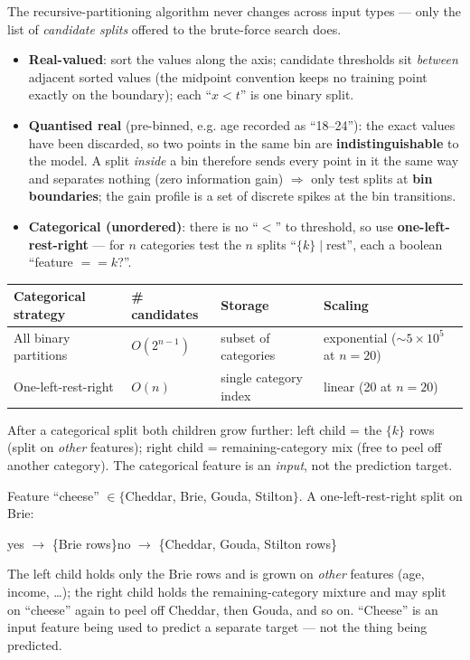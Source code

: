 \documentclass[11pt, a4paper]{article}
\newcommand{\thead}[1]{\textbf{#1}}
\newcommand{\kw}[1]{\textbf{#1}}
\begin{document}
The recursive-partitioning algorithm never changes across input types — only the list of
\emph{candidate splits} offered to the brute-force search does.

\begin{itemize}
  \item \kw{Real-valued}: sort the values along the axis; candidate thresholds sit \emph{between}
  adjacent sorted values (the midpoint convention keeps no training point exactly on the boundary);
  each ``$x<t$'' is one binary split.
  \item \kw{Quantised real} (pre-binned, e.g. age recorded as ``18--24''): the exact values have been
  discarded, so two points in the same bin are \kw{indistinguishable} to the model. A split
  \emph{inside} a bin therefore sends every point in it the same way and separates nothing (zero
  information gain) $\Rightarrow$ only test splits at \kw{bin boundaries}; the gain profile is a set
  of discrete spikes at the bin transitions.
  \item \kw{Categorical (unordered)}: there is no ``$<$'' to threshold, so use
  \kw{one-left-rest-right} — for $n$ categories test the $n$ splits ``$\{k\}\mid\text{rest}$'', each a
  boolean ``feature $==k$?''.
\end{itemize}

\begin{center}
\renewcommand{\arraystretch}{1.2}
\begin{tabularx}{\linewidth}{l l l X}
\toprule
\thead{Categorical strategy} & \thead{\# candidates} & \thead{Storage} & \thead{Scaling} \\
\midrule
All binary partitions & $O(2^{n-1})$ & subset of categories & exponential ($\sim5\times10^5$ at $n{=}20$) \\
One-left-rest-right & $O(n)$ & single category index & linear (20 at $n{=}20$) \\
\bottomrule
\end{tabularx}
\end{center}

After a categorical split both children grow further: left child = the $\{k\}$ rows (split on
\emph{other} features); right child = remaining-category mix (free to peel off another category).
The categorical feature is an \emph{input}, not the prediction target.

\begin{exbox}
Feature ``cheese'' $\in\{$Cheddar, Brie, Gouda, Stilton$\}$. A one-left-rest-right split on Brie:
\begin{center}\small\ttfamily
[\,cheese == Brie?\,]\quad yes $\to$ \{Brie rows\}\qquad no $\to$ \{Cheddar, Gouda, Stilton rows\}
\end{center}
The left child holds only the Brie rows and is grown on \emph{other} features (age, income, \dots);
the right child holds the remaining-category mixture and may split on ``cheese'' again to peel off
Cheddar, then Gouda, and so on. ``Cheese'' is an input feature being used to predict a separate
target — not the thing being predicted.
\end{exbox}
\end{document}
